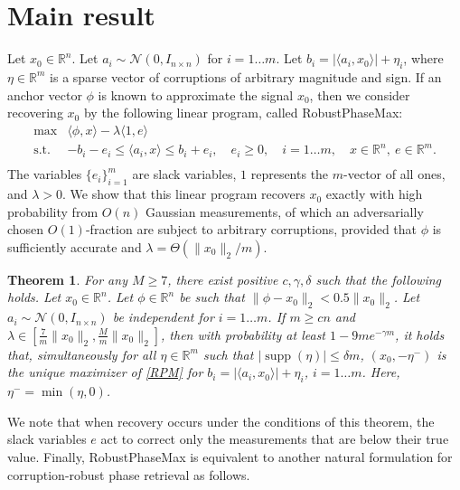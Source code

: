 \documentclass[12pt]{article}
\newcommand{\1}{\mathbbm{1}}
\DeclareMathOperator*{\supp}{supp}
\newcommand{\xo}{x_0}
\newcommand{\R}{\mathbb{R}}
\newcommand{\etam}{\eta^-}
\newcommand{\aixo}{\langle a_i, \xo \rangle}
\newtheorem{theorem}{Theorem} %
\begin{document}
\section{Main result}

Let $\xo \in \R^n$.  Let $a_i \sim \mathcal{N}(0, I_{n \times n})$ for $i=1 \ldots m$.  Let $b_i = | \langle a_i, \xo \rangle | + \eta_i$, where $\eta\in\R^m$ is a sparse vector of  corruptions of arbitrary magnitude and sign.  If an anchor vector $\phi$ is known to approximate the signal $\xo$, then we consider recovering $\xo$ by the following linear program, called RobustPhaseMax:
\begin{equation}\label{RPM}
\begin{array}{ll}
\max & \langle \phi, x \rangle - \lambda \langle 1, e \rangle \\[.5em]
\text{s.t.} & -b_i - e_i \leq \langle a_i, x \rangle \leq b_i + e_i, \quad e_i \geq 0, \quad   i = 1\ldots  m, \quad x \in \mathbb{R}^n, \ e \in \R^m.\\ 
\end{array}
\end{equation}
The variables $\{e_i\}_{i=1}^m$ are slack variables, $1$ represents the $m$-vector of all ones, and $\lambda > 0$.  We show that this linear program recovers $\xo$ exactly with high probability from $O(n)$ Gaussian measurements, of which an adversarially chosen $O(1)$-fraction are subject to arbitrary corruptions, provided that $\phi$ is sufficiently accurate and $\lambda = \Theta(\|\xo\|_2/m)$.

\begin{theorem} \label{thm:rpm}
For any $M\geq 7$, there exist  positive  $c, \gamma, \delta$ such that the following holds.  Let $\xo \in \R^n$.  Let $\phi \in \R^n$ be such that $\|\phi - \xo\|_2 < 0.5 \|\xo\|_2$.    Let $a_i \sim \mathcal{N}(0, I_{n \times n})$ be independent for $i = 1 \ldots m$.   If  $m \geq c n$ and $\lambda \in \left[ \frac{7}{m} \|\xo\|_2, \frac{M}{m} \|\xo\|_2\right]$, then with probability at least $1 - 9 m e^{-\gamma m}$, it holds that, simultaneously  for  all $\eta \in \R^m$ such that $| \supp (\eta) | \leq \delta m$, $(\xo, -\etam)$ is the unique maximizer of \eqref{RPM} for $b_i = | \aixo| + \eta_i$, $i = 1\ldots m$.  Here, $\etam  = \min(\eta, 0)$.

\end{theorem}

We note that when recovery occurs under the conditions of this theorem, the slack variables $e$ act to correct only the measurements that are below their true value.  Finally, RobustPhaseMax is equivalent to another natural formulation for corruption-robust phase retrieval as follows.
\end{document}
